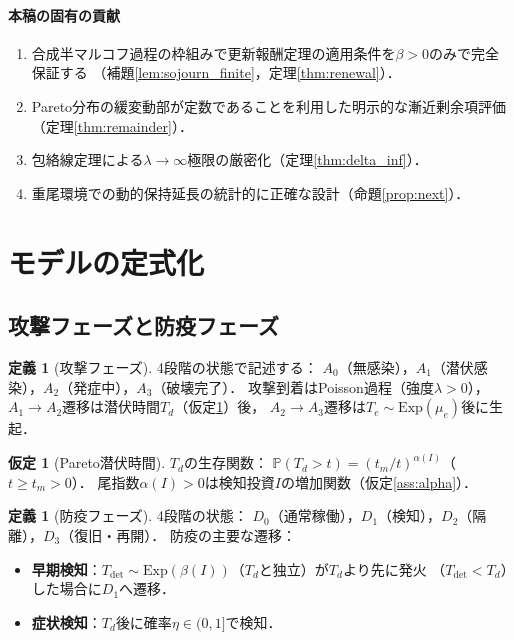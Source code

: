 \documentclass[12pt,a4paper]{article}
\theoremstyle{plain}
\theoremstyle{definition}
\newtheorem{definition}[theorem]{定義}
\newtheorem{assumption}[theorem]{仮定}
\theoremstyle{remark}
\newcommand{\Prob}{\mathbb{P}}
\newcommand{\Tdet}{T_{\mathrm{det}}}
\newcommand{\betaI}{\beta(I)}
\newcommand{\alphI}{\alpha(I)}
\begin{document}
\paragraph{本稿の固有の貢献}
\begin{enumerate}[leftmargin=*]
\item 合成半マルコフ過程の枠組みで更新報酬定理の適用条件を$\beta>0$のみで完全保証する
  （補題\ref{lem:sojourn_finite}，定理\ref{thm:renewal}）．
\item Pareto分布の緩変動部が定数であることを利用した明示的な漸近剰余項評価（定理\ref{thm:remainder}）．
\item 包絡線定理による$\lambda\to\infty$極限の厳密化（定理\ref{thm:delta_inf}）．
\item 重尾環境での動的保持延長の統計的に正確な設計（命題\ref{prop:next}）．
\end{enumerate}

\section{モデルの定式化}
\label{sec:model}

\subsection{攻撃フェーズと防疫フェーズ}

\begin{definition}[攻撃フェーズ]\label{def:attack}
4段階の状態で記述する：
$A_0$（無感染），$A_1$（潜伏感染），$A_2$（発症中），$A_3$（破壊完了）．
攻撃到着はPoisson過程（強度$\lambda>0$），
$A_1\to A_2$遷移は潜伏時間$T_d$（仮定\ref{ass:pareto}）後，
$A_2\to A_3$遷移は$T_e\sim\mathrm{Exp}(\mu_e)$後に生起．
\end{definition}

\begin{assumption}[Pareto潜伏時間]\label{ass:pareto}
$T_d$の生存関数：
$\Prob(T_d>t)=(t_m/t)^{\alphI}$（$t\ge t_m>0$）．
尾指数$\alphI>0$は検知投資$I$の増加関数（仮定\ref{ass:alpha}）．
\end{assumption}

\begin{definition}[防疫フェーズ]\label{def:defense}
4段階の状態：
$D_0$（通常稼働），$D_1$（検知），$D_2$（隔離），$D_3$（復旧・再開）．
防疫の主要な遷移：
\begin{itemize}
\item \textbf{早期検知}：$\Tdet\sim\mathrm{Exp}(\betaI)$（$T_d$と独立）が$T_d$より先に発火
  （$\Tdet<T_d$）した場合に$D_1$へ遷移．
\item \textbf{症状検知}：$T_d$後に確率$\eta\in(0,1]$で検知．
\end{itemize}
\end{definition}
\end{document}
